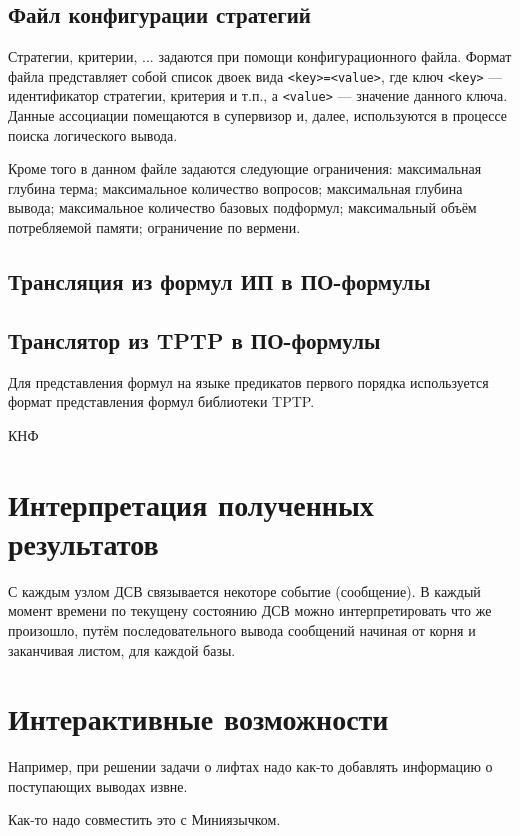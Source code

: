 \subsection{Файл конфигурации стратегий}
Стратегии, критерии, ... задаются при помощи конфигурационного файла. Формат файла представляет собой список двоек вида \texttt{<key>=<value>}, где ключ \texttt{<key>} --- идентификатор стратегии, критерия и т.п., а \texttt{<value>} --- значение данного ключа. Данные ассоциации помещаются в супервизор и, далее, используются в процессе поиска логического вывода.

Кроме того в данном файле задаются следующие ограничения: максимальная глубина терма; максимальное количество вопросов; максимальная глубина вывода; максимальное количество базовых подформул; максимальный объём потребляемой памяти; ограничение по вермени.

\subsection{Трансляция из формул ИП в ПО-формулы}


\subsection{Транслятор из TPTP в ПО-формулы}
Для представления формул на языке предикатов первого порядка используется формат представления формул библиотеки TPTP.

КНФ

\section{Интерпретация полученных результатов}
С каждым узлом ДСВ связывается некоторе событие (сообщение). В каждый момент времени по текущену состоянию ДСВ можно интерпретировать что же произошло, путём последовательного вывода сообщений начиная от корня и заканчивая листом, для каждой базы.


\section{Интерактивные возможности}
Например, при решении задачи о лифтах надо как-то добавлять информацию о поступающих выводах извне.

Как-то надо совместить это с Миниязычком.

